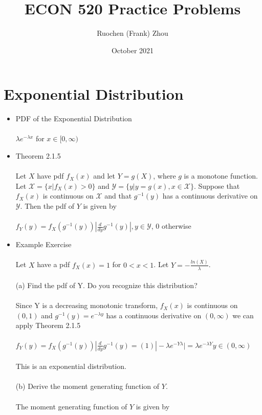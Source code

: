 \documentclass{article}
\title{ECON 520 Practice Problems}
\author{Ruochen (Frank) Zhou }
\date{October 2021}
\begin{document}
\maketitle

\section{Exponential Distribution}
\begin{itemize}
    \item PDF of the Exponential Distribution\\\\
    $\lambda e^{-\lambda x}$ for $x\in[0,\infty)$\\
    \item Theorem 2.1.5\\\\
    Let $X$ have pdf $f_X(x)$ and let $Y=g(X)$, where $g$ is a monotone function. Let $\mathcal{X}=\{x|f_X(x)>0\}$ and $\mathcal{Y}=\{y|y=g(x),x\in\mathcal{X}\}$.  Suppose that $f_X(x)$ is continuous on $\mathcal{X}$ and that $g^{-1}(y)$ has a continuous derivative on $\mathcal{Y}$.  Then the pdf of $Y$ is given by\\\\
    $f_Y(y)=f_X(g^{-1}(y))|\frac{d}{dy}g^{-1}(y)|, y\in\mathcal{Y}$, 0 otherwise\\
    \item Example Exercise\\\\
    Let $X$ have a pdf $f_X(x)=1$ for $0<x<1$.  Let $Y=-\frac{ln(X)}{\lambda}$.\\\\
    (a) Find the pdf of Y.  Do you recognize this distribution?\\\\
    Since Y is a decreasing monotonic transform, $f_X(x)$ is continuous on $(0,1)$ and $g^{-1}(y)=e^{-\lambda y}$ has a continuous derivative on $(0,\infty)$ we can apply Theorem 2.1.5\\\\
    $f_Y(y) = f_X(g^{-1}(y))|\frac{d}{dy}g^{-1}(y)=(1)|-\lambda e^{-Y\lambda}|=\lambda e^{-\lambda Y} y\in(0,\infty)$\\\\
    This is an exponential distribution.\\\\
    (b) Derive the moment generating function of $Y$.\\\\
    The moment generating function of $Y$ is given by\\\\

\end{itemize}
\end{document}
